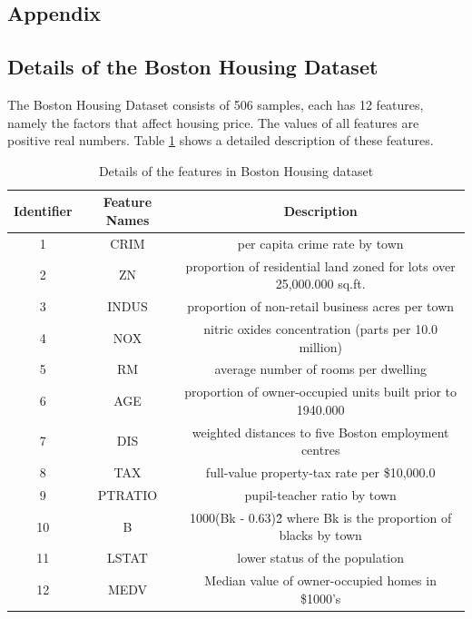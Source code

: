 \documentclass[12pt,a4paper]{article}
\theoremstyle{definition}
\begin{document}
\newpage
\begin{appendix}
\section{Appendix}

\subsection{Details of the Boston Housing Dataset}
\label{apd:boston}

The Boston Housing Dataset consists of 506 samples, each has 12 features, namely the factors that affect housing price. The values of all features are positive real numbers. Table \ref{tab:boston} shows a detailed description of these features.

\begin{table}[H]
	\renewcommand\arraystretch{1.35}
	\caption{Details of the features in Boston Housing dataset}
	\label{tab:boston}
	\centering
	
	\begin{tabular}{c|c|c}
		\centering
		Identifier & Feature Names & Description \\
		\hline
		1 & CRIM & per capita crime rate by town \\
		2 & ZN & proportion of residential land zoned for lots over 25,000.000 sq.ft. \\
		3 & INDUS & proportion of non-retail business acres per town \\
		4 & NOX & nitric oxides concentration (parts per 10.0 million) \\
		5 & RM & average number of rooms per dwelling \\
		6 & AGE & proportion of owner-occupied units built prior to 1940.000 \\
		7 & DIS & weighted distances to five Boston employment centres \\
		8 & TAX & full-value property-tax rate per \$10,000.0 \\
		9 & PTRATIO & pupil-teacher ratio by town \\
		10 & B & 1000(Bk - 0.63)\^2 where Bk is the proportion of blacks by town \\
		11 & LSTAT & lower status of the population \\			
		12 & MEDV & Median value of owner-occupied homes in \$1000's \\
	\end{tabular}
\end{table}


\end{appendix}
\end{document}
